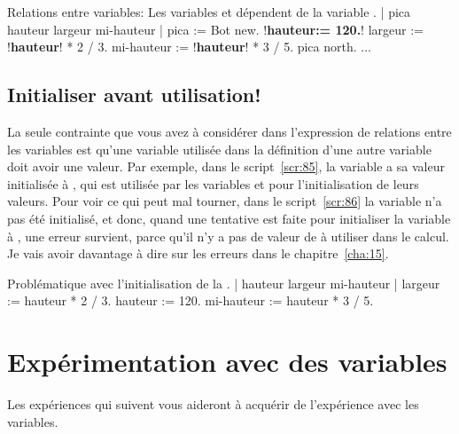 \documentclass[a4paper,10pt,twoside]{book}
\begin{document}
\begin{script}[85]{Relations entre variables: Les variables   et   d\'ependent de la variable .}
| pica hauteur largeur mi-hauteur | 
pica := Bot new. 
!\textbf{hauteur:= 120.}!
largeur := !\textbf{hauteur}! * 2 / 3. 
mi-hauteur := !\textbf{hauteur}! * 3 / 5. 
pica north. 
... 
\end{script}

\subsection{Initialiser avant utilisation! } 

La seule contrainte que vous avez \`a consid\'erer dans l'expression de relations entre les variables est qu'une variable utilis\'ee dans la d\'efinition d'une autre variable doit avoir une valeur. Par exemple, dans le script~\ref{scr:85}, la variable  a sa valeur initialis\'ee \`a , qui est utilis\'ee par les variables   et  pour l'initialisation de leurs valeurs. Pour voir ce qui peut mal tourner, dans le script~\ref{scr:86} la variable  n'a pas \'et\'e initialis\'e, et donc, quand une tentative est faite pour initialiser la variable   \`a  , une erreur survient, parce qu'il n'y a pas de valeur de   \`a utiliser dans le calcul. Je vais avoir davantage \`a dire sur les erreurs dans le chapitre~\ref{cha:15}.

\begin{script}[86]{Probl\'ematique avec l'initialisation de la .}
| hauteur largeur mi-hauteur | 
largeur := hauteur * 2 / 3. 
hauteur := 120. 
mi-hauteur := hauteur * 3 / 5.
\end{script}


\section{Exp\'erimentation avec des variables }

Les exp\'eriences qui suivent vous aideront \`a acqu\'erir de l'exp\'erience avec les variables.   
\end{document}

